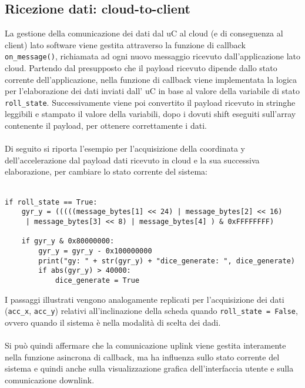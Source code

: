 \subsection{Ricezione dati: cloud-to-client}
La gestione della comunicazione dei dati dal uC al cloud (e di conseguenza al client) lato software viene gestita attraverso la funzione di callback 
\Verb|on_message()|, richiamata ad ogni nuovo messaggio ricevuto dall'applicazione lato cloud. Partendo dal presupposto che il payload ricevuto
dipende dallo stato corrente dell'applicazione, nella funzione di callback viene implementata la logica per l'elaborazione dei dati inviati dall' uC in base al valore
della variabile di stato \Verb|roll_state|. Successivamente viene poi convertito il payload ricevuto in stringhe leggibili e stampato il valore della variabili, 
dopo i dovuti shift eseguiti sull'array contenente il payload, per ottenere correttamente i dati.
\\\\Di seguito si riporta l'esempio per l'acquisizione della coordinata y dell'accelerazione dal payload dati ricevuto in cloud e la sua 
successiva elaborazione, per cambiare lo stato corrente del sistema:\\\\
\begin{verbatim}
if roll_state == True:
    gyr_y = (((((message_bytes[1] << 24) | message_bytes[2] << 16)
     | message_bytes[3] << 8) | message_bytes[4] ) & 0xFFFFFFFF)  

    if gyr_y & 0x80000000:
        gyr_y = gyr_y - 0x100000000
        print("gy: " + str(gyr_y) + "dice_generate: ", dice_generate)
        if abs(gyr_y) > 40000:
            dice_generate = True
\end{verbatim}
I passaggi illustrati vengono analogamente replicati per l'acquisizione dei dati (\Verb|acc_x|, \Verb|acc_y|) relativi all'inclinazione della scheda
quando \Verb|roll_state = False|, ovvero quando il sistema è nella modalità di scelta dei dadi.
\\\\Si può quindi affermare che la comunicazione uplink viene gestita interamente nella funzione asincrona di callback, ma ha influenza 
sullo stato corrente del sistema e quindi anche sulla visualizzazione grafica dell'interfaccia utente e sulla comunicazione downlink.

